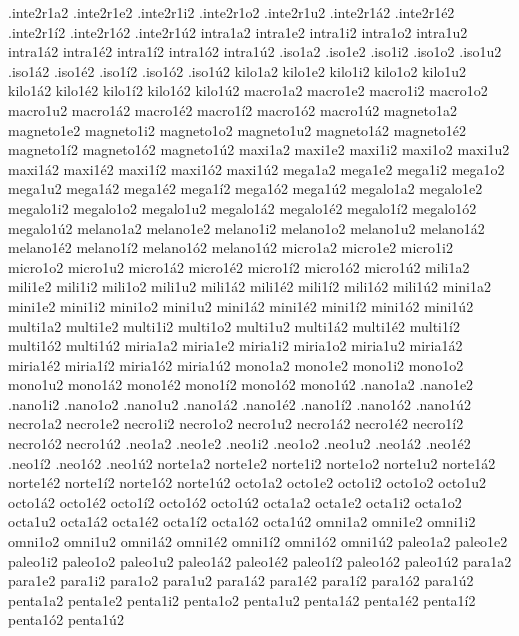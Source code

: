 {{.inte2r1a2 .inte2r1e2 .inte2r1i2 .inte2r1o2 .inte2r1u2 .inte2r1^^e12 .inte2r1^^e92 .inte2r1^^ed2 .inte2r1^^f32 .inte2r1^^fa2 
intra1a2 intra1e2 intra1i2 intra1o2 intra1u2 intra1^^e12 intra1^^e92 intra1^^ed2 intra1^^f32 intra1^^fa2 
.iso1a2 .iso1e2 .iso1i2 .iso1o2 .iso1u2 .iso1^^e12 .iso1^^e92 .iso1^^ed2 .iso1^^f32 .iso1^^fa2 
kilo1a2 kilo1e2 kilo1i2 kilo1o2 kilo1u2 kilo1^^e12 kilo1^^e92 kilo1^^ed2 kilo1^^f32 kilo1^^fa2 
macro1a2 macro1e2 macro1i2 macro1o2 macro1u2 macro1^^e12 macro1^^e92 macro1^^ed2 macro1^^f32 macro1^^fa2 
magneto1a2 magneto1e2 magneto1i2 magneto1o2 magneto1u2 magneto1^^e12 magneto1^^e92 magneto1^^ed2 magneto1^^f32 magneto1^^fa2 
maxi1a2 maxi1e2 maxi1i2 maxi1o2 maxi1u2 maxi1^^e12 maxi1^^e92 maxi1^^ed2 maxi1^^f32 maxi1^^fa2 
mega1a2 mega1e2 mega1i2 mega1o2 mega1u2 mega1^^e12 mega1^^e92 mega1^^ed2 mega1^^f32 mega1^^fa2 
megalo1a2 megalo1e2 megalo1i2 megalo1o2 megalo1u2 megalo1^^e12 megalo1^^e92 megalo1^^ed2 megalo1^^f32 megalo1^^fa2 
melano1a2 melano1e2 melano1i2 melano1o2 melano1u2 melano1^^e12 melano1^^e92 melano1^^ed2 melano1^^f32 melano1^^fa2 
micro1a2 micro1e2 micro1i2 micro1o2 micro1u2 micro1^^e12 micro1^^e92 micro1^^ed2 micro1^^f32 micro1^^fa2 
mili1a2 mili1e2 mili1i2 mili1o2 mili1u2 mili1^^e12 mili1^^e92 mili1^^ed2 mili1^^f32 mili1^^fa2 
mini1a2 mini1e2 mini1i2 mini1o2 mini1u2 mini1^^e12 mini1^^e92 mini1^^ed2 mini1^^f32 mini1^^fa2 
multi1a2 multi1e2 multi1i2 multi1o2 multi1u2 multi1^^e12 multi1^^e92 multi1^^ed2 multi1^^f32 multi1^^fa2 
miria1a2 miria1e2 miria1i2 miria1o2 miria1u2 miria1^^e12 miria1^^e92 miria1^^ed2 miria1^^f32 miria1^^fa2 
mono1a2 mono1e2 mono1i2 mono1o2 mono1u2 mono1^^e12 mono1^^e92 mono1^^ed2 mono1^^f32 mono1^^fa2 
.nano1a2 .nano1e2 .nano1i2 .nano1o2 .nano1u2 .nano1^^e12 .nano1^^e92 .nano1^^ed2 .nano1^^f32 .nano1^^fa2 
necro1a2 necro1e2 necro1i2 necro1o2 necro1u2 necro1^^e12 necro1^^e92 necro1^^ed2 necro1^^f32 necro1^^fa2 
.neo1a2 .neo1e2 .neo1i2 .neo1o2 .neo1u2 .neo1^^e12 .neo1^^e92 .neo1^^ed2 .neo1^^f32 .neo1^^fa2 
norte1a2 norte1e2 norte1i2 norte1o2 norte1u2 norte1^^e12 norte1^^e92 norte1^^ed2 norte1^^f32 norte1^^fa2 
octo1a2 octo1e2 octo1i2 octo1o2 octo1u2 octo1^^e12 octo1^^e92 octo1^^ed2 octo1^^f32 octo1^^fa2 
octa1a2 octa1e2 octa1i2 octa1o2 octa1u2 octa1^^e12 octa1^^e92 octa1^^ed2 octa1^^f32 octa1^^fa2 
omni1a2 omni1e2 omni1i2 omni1o2 omni1u2 omni1^^e12 omni1^^e92 omni1^^ed2 omni1^^f32 omni1^^fa2 
paleo1a2 paleo1e2 paleo1i2 paleo1o2 paleo1u2 paleo1^^e12 paleo1^^e92 paleo1^^ed2 paleo1^^f32 paleo1^^fa2 
para1a2 para1e2 para1i2 para1o2 para1u2 para1^^e12 para1^^e92 para1^^ed2 para1^^f32 para1^^fa2 
penta1a2 penta1e2 penta1i2 penta1o2 penta1u2 penta1^^e12 penta1^^e92 penta1^^ed2 penta1^^f32 penta1^^fa2 
}}
